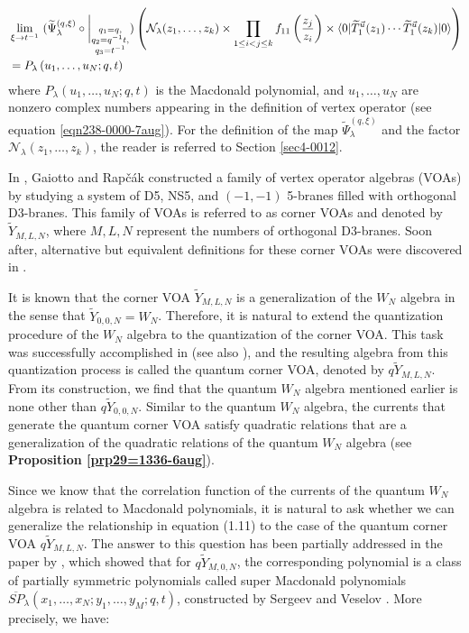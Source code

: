 \documentclass[12pt,reqno,a4paper]{amsart}
\newcommand{\comp}{\circ}
\newcommand{\cals}[1]{\mathcal{#1}}
\numberwithin{equation}{section}
\newcommand{\supermac}{\overline{SP}}
\newcommand{\dualmap}{
\widetilde{\Psi}^{(q,\xi)}_{\lambda}
}
\theoremstyle{definition}
\begin{document}
\footnotesize
\begin{align}
	&
	\lim_{\xi \rightarrow t^{-1}}\,\,
	(
	\dualmap
	\comp 
	\bigg|_{
		\substack{
			q_1 = q, \\
			q_2 = q^{-1}t,\\
			q_3 = t^{-1} \\
		}
	}
	)
	\left(
	\cals{N}_{\lambda}(z_1,\dots,z_k )
	\times
	\prod_{1 \leq i < j \leq k}f_{11}\left(\frac{z_j}{z_i} \right)
	\times
	\langle 0 |\widetilde{T}^{\vec{u}}_{1}(z_1 )\cdots \widetilde{T}^{\vec{u}}_{1}(z_k )|0\rangle
	\right)
	\label{eqn11-1058-7aug}
	\\
	&= 
	P_\lambda\left(
	u_1,\dots,u_N ; q,t
	\right)
	\notag 
\end{align}
\normalsize
where $P_\lambda(u_1,\dots,u_N;q,t)$ is the Macdonald polynomial, and $u_1,\dots,u_N$ are nonzero complex numbers appearing in the definition of vertex operator (see equation \eqref{eqn238-0000-7aug}). For the definition of the map $\dualmap$ and the factor $\cals{N}_{\lambda}(z_1,\dots,z_k )$, the reader is referred to Section \ref{sec4-0012}. 


In \cite{GR17}, Gaiotto and Rap\v{c}\'{a}k constructed a family of vertex operator algebras (VOAs) by studying a system of D5, NS5, and $(-1,-1)$ 5-branes filled with orthogonal D3-branes. This family of VOAs is referred to as corner VOAs and denoted by $\widetilde{Y}_{M,L,N}$, where $M,L,N$ represent the numbers of orthogonal D3-branes. Soon after, alternative but equivalent definitions for these corner VOAs were discovered in \cite{PR17} \cite{PR18}. 


It is known that the corner VOA $\widetilde{Y}_{M,L,N}$ is a generalization of the $W_N$ algebra in the sense that $\widetilde{Y}_{0,0,N} = W_N$. Therefore, it is natural to extend the quantization procedure of the $W_N$ algebra to the quantization of the corner VOA. This task was successfully accomplished in \cite{HMNW} (see also \cite{Misha}), and the resulting algebra from this quantization process is called the quantum corner VOA, denoted by $q\widetilde{Y}_{M,L,N}$. From its construction, we find that the quantum $W_N$ algebra mentioned earlier is none other than $q\widetilde{Y}_{0,0,N}$. Similar to the quantum $W_N$ algebra, the currents that generate the quantum corner VOA satisfy quadratic relations that are a generalization of the quadratic relations of the quantum $W_N$ algebra (see \textbf{Proposition \ref{prp29=1336-6aug}}).

Since we know that the correlation function of the currents of the quantum $W_N$ algebra is related to Macdonald polynomials, it is natural to ask whether we can generalize the relationship in equation (1.11) to the case of the quantum corner VOA $q\widetilde{Y}_{M,L,N}$. The answer to this question has been partially addressed in the paper by \cite{CSW2025}, which showed that for $q\widetilde{Y}_{M,0,N}$, the corresponding polynomial is a class of partially symmetric polynomials called super Macdonald polynomials $\supermac_\lambda(x_1,\dots,x_N;y_1,\dots,y_M;q,t)  $, constructed by Sergeev and Veselov \cite{sv2007-supermac}. More precisely, we have:
\end{document}
